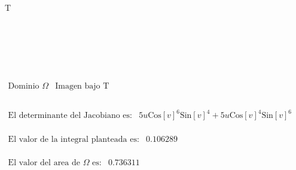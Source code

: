 \documentclass{article}
\begin{document}
\begin{doublespace}
{T \text{*)}}\\
\\
\\
\pmb{}\\
\\
\\
\)
\end{doublespace}

\begin{doublespace}
\noindent\(\begin{array}{cc}
 \text{Dominio $\Omega $} & \text{Imagen bajo T} \\
  &  \\
\end{array}\)
\end{doublespace}

\begin{doublespace}
\noindent\(\begin{array}{cc}
 \text{El determinante del Jacobiano es:} & 5 u \text{Cos}[v]^6 \text{Sin}[v]^4+5 u \text{Cos}[v]^4 \text{Sin}[v]^6 \\
\end{array}\)
\end{doublespace}

\begin{doublespace}
\noindent\(\begin{array}{cc}
 \text{El valor de la integral planteada es:} & 0.106289 \\
\end{array}\)
\end{doublespace}

\begin{doublespace}
\noindent\(\begin{array}{cc}
 \text{El valor del area de $\Omega $ es:} & 0.736311 \\
\end{array}\)
\end{doublespace}
\end{document}

